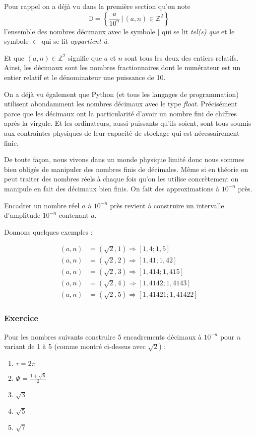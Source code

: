 \documentclass[a4paper, 11pt, twoside]{article}
\newcommand{\E}[1]{\mathbb{#1}}
\begin{document}
Pour rappel on a déjà vu dans la première section qu'on note
\[\E{D} = \left\{ \dfrac{a}{10^n}\,|\,(a, n)\in\E{Z}^2\right\}\]
l'ensemble des nombres décimaux avec le symbole \(|\) qui se lit
\emph{tel(s) que} et le symbole \(\in\) qui se lit \emph{appartient à}.

Et que \((a, n)\in\E{Z}^2\) signifie que \(a\) et \(n\) sont tous
les deux des entiers relatifs. Ainsi, les décimaux sont les nombres
fractionnaires dont le numérateur est un entier relatif et le
dénominateur une puissance de 10.

On a déjà vu également que Python (et tous les langages de
programmation) utilisent abondamment les nombres décimaux avec le
type \emph{float}. Précisément parce que les décimaux ont la
particularité d'avoir un nombre fini de chiffres après la
virgule. Et les ordinateurs, aussi puissants qu'ils soient, sont
tous soumis aux contraintes physiques de leur capacité de
stockage qui est nécessairement finie.

De toute façon, nous vivons dans un monde physique limité donc nous
sommes bien obligés de manipuler des nombres finis de
décimales. Même si en théorie on peut traiter des nombres réels à
chaque fois qu'on les utilise concrètement on manipule en fait des
décimaux bien finis. On fait des approximations à \(10^{-n}\) près.

Encadrer un nombre réel \(a\) à \(10^{-n}\) près revient à construire
un intervalle d'amplitude \(10^{-n}\) contenant \(a\).

Donnons quelques exemples :

\begin{align*}
(a, n) &= (\sqrt{2}, 1)\Rightarrow [1,4 ; 1,5]\\
(a, n) &= (\sqrt{2}, 2)\Rightarrow [1,41 ; 1,42]\\
(a, n) &= (\sqrt{2}, 3)\Rightarrow [1,414 ; 1,415]\\
(a, n) &= (\sqrt{2}, 4)\Rightarrow [1,4142 ; 1,4143]\\
(a, n) &= (\sqrt{2}, 5)\Rightarrow [1,41421 ; 1,41422]
\end{align*}

\subsubsection{Exercice}
\label{sec:org23137bc}
Pour les nombres suivants construire 5 encadrements décimaux à
\(10^{-n}\) pour \(n\) variant de 1 à 5 (comme montré ci-dessus avec
\(\sqrt{2}\)) :
\begin{enumerate}
\item \(\tau = 2\pi\)
\item \(\Phi = \frac{1 + \sqrt{5}}{2}\)
\item \(\sqrt{3}\)
\item \(\sqrt{5}\)
\item \(\sqrt{7}\)
\end{enumerate}
\end{document}
